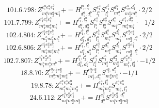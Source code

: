 \documentclass[letterpaper,10pt,fleqn,leqno,onecolumn]{article}
\begin{document}
\begin{equation} \;\;\;\;\;\;  101.6.798: Z^{e_{1}^{a}e_{2}^{a}e_{1}^{b}}_{m_{1}^{a}m_{2}^{a}m_{1}^{b}}+=H^{l_{1}^{a},l_{1}^{b}}_{d_{1}^{a},d_{1}^{b}}S^{e_{1}^{a}}_{l_{1}^{a}}S^{e_{1}^{b}}_{l_{1}^{b}}S^{d_{1}^{a}}_{m_{1}^{a}}S^{e_{2}^{a},d_{1}^{b}}_{m_{2}^{a}m_{1}^{b}}\cdot 2/2 \end{equation}
\begin{equation} \;\;\;\;\;\;  101.7.799: Z^{e_{1}^{a}e_{2}^{a}e_{1}^{b}}_{m_{1}^{a}m_{2}^{a}m_{1}^{b}}+=H^{l_{1}^{a},l_{2}^{a}}_{d_{1}^{a},d_{2}^{a}}S^{e_{1}^{a}}_{l_{1}^{a}}S^{e_{2}^{a}}_{l_{2}^{a}}S^{d_{1}^{a}}_{m_{1}^{a}}S^{e_{1}^{b},d_{2}^{a}}_{m_{2}^{a}m_{1}^{b}}\cdot -1/2 \end{equation}
\begin{equation} \;\;\;\;\;\;  102.4.804: Z^{e_{1}^{a}e_{2}^{a}e_{1}^{b}}_{m_{1}^{a}m_{2}^{a}m_{1}^{b}}+=H^{l_{1}^{b},l_{1}^{a}}_{d_{1}^{a},d_{1}^{b}}S^{e_{1}^{b}}_{l_{1}^{b}}S^{d_{1}^{a}}_{m_{1}^{a}}S^{d_{1}^{b}}_{m_{1}^{b}}S^{e_{1}^{a}e_{2}^{a}}_{m_{2}^{a},l_{1}^{a}}\cdot 2/2 \end{equation}
\begin{equation} \;\;\;\;\;\;  102.6.806: Z^{e_{1}^{a}e_{2}^{a}e_{1}^{b}}_{m_{1}^{a}m_{2}^{a}m_{1}^{b}}+=H^{l_{1}^{a},l_{1}^{b}}_{d_{1}^{a},d_{1}^{b}}S^{e_{1}^{a}}_{l_{1}^{a}}S^{d_{1}^{a}}_{m_{1}^{a}}S^{d_{1}^{b}}_{m_{1}^{b}}S^{e_{2}^{a}e_{1}^{b}}_{m_{2}^{a},l_{1}^{b}}\cdot 2/2 \end{equation}
\begin{equation} \;\;\;\;\;\;  102.7.807: Z^{e_{1}^{a}e_{2}^{a}e_{1}^{b}}_{m_{1}^{a}m_{2}^{a}m_{1}^{b}}+=H^{l_{1}^{a},l_{2}^{a}}_{d_{1}^{a},d_{2}^{a}}S^{e_{1}^{a}}_{l_{1}^{a}}S^{d_{1}^{a}}_{m_{1}^{a}}S^{d_{2}^{a}}_{m_{2}^{a}}S^{e_{2}^{a}e_{1}^{b}}_{m_{1}^{b},l_{2}^{a}}\cdot -1/2 \end{equation}
\begin{equation} \;\;\;\;\;\;  18.8.70: Z^{e_{1}^{a}e_{2}^{a}e_{3}^{a}}_{m_{1}^{a}m_{2}^{a}m_{3}^{a}}+=H^{e_{1}^{a}e_{2}^{a}}_{m_{1}^{a},d_{1}^{a}}S^{e_{3}^{a},d_{1}^{a}}_{m_{2}^{a}m_{3}^{a}}\cdot -1/1 \end{equation}
\begin{equation} \;\;\;\;\;\;  19.8.78: Z^{e_{1}^{a}e_{2}^{a}e_{3}^{a}}_{m_{1}^{a}m_{2}^{a}m_{3}^{a}}+=H^{e_{1}^{a},l_{1}^{a}}_{m_{1}^{a}m_{2}^{a}}S^{e_{2}^{a}e_{3}^{a}}_{m_{3}^{a},l_{1}^{a}} \end{equation}
\begin{equation} \;\;\;\;\;\;  24.6.112: Z^{e_{1}^{a}e_{2}^{a}e_{3}^{a}}_{m_{1}^{a}m_{2}^{a}m_{3}^{a}}+=H^{e_{1}^{a}}_{d_{1}^{a}}S^{e_{2}^{a}e_{3}^{a},d_{1}^{a}}_{m_{1}^{a}m_{2}^{a}m_{3}^{a}} \end{equation}
\end{document}
